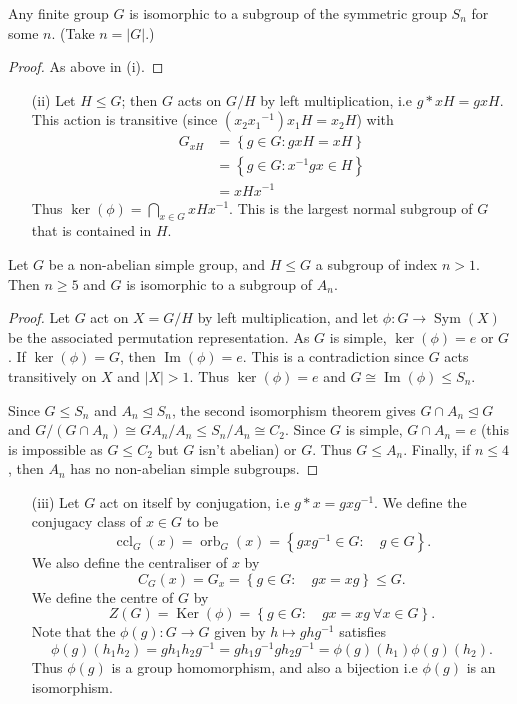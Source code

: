 \documentclass[egregdoesnotlikesansseriftitles,a4paper]{scrartcl}
\begin{document}
 \begin{theorem}
     Any finite group $G$ is isomorphic to a subgroup of the symmetric group $S_{n}$ for some $n$. (Take $n=|G|$.)
     \begin{proof}
      As above in (i).
      \end{proof}
 \end{theorem}
 \begin{itemize}
      \item[(ii)] Let $H \leq G$; then $G$ acts on $G/H$ by left multiplication, i.e $g \ast x H= gxH$. This action is transitive (since $(x_2 {x_1 }^{-1})x_1 H=x_2 H$) with 
      \begin{align*}
          G_{xH}&=\left\{g \in G: gxH=xH\right\}\\&=\left\{g \in G: {x}^{-1}gx \in H\right\}\\&=xH {x}^{-1} 
      \end{align*} Thus $\operatorname{ker}(\phi)=\bigcap_{x \in G}xH {x}^{-1}$. This is the largest normal subgroup of $G$ that is contained in $H$.  
 \end{itemize}
 \begin{theorem}
       Let $G$ be a non-abelian simple group, and $H \leq G$ a subgroup of index $n>1$. Then $n \geq 5$ and $G$ is isomorphic to a subgroup of $A_{n}$.
       \begin{proof}
            Let $G$ act on $X=G/H$ by left multiplication, and let $\phi: G \rightarrow \operatorname{Sym}(X)$ be the associated permutation representation. As $G$ is simple, $\operatorname{ker}(\phi)=e$ or $G$. If $\operatorname{ker}(\phi)=G$, then $\operatorname{Im}(\phi)=e$. This is a contradiction since $G$ acts transitively on $X$ and $|X|>1$. Thus $\operatorname{ker}(\phi)=e$ and $G \cong \operatorname{Im}(\phi) \leq S_{n}.$ 
            
            Since $G \leq S_{n}$ and $A_n \unlhd S_n$, the second isomorphism theorem gives $G \cap A_n \unlhd G$ and $G/(G \cap A_n) \cong GA_n/A_n \leq S_n / A_n \cong C_2 $. Since $G$ is simple, $G \cap A_n=e$ (this is impossible as $G \leq C_2 $ but $G$ isn't abelian) or $G$. Thus $G \leq A_{n} $. Finally, if $n \leq 4$, then $A_n$ has no non-abelian simple subgroups.
        \end{proof}
 \end{theorem}
\begin{itemize}
     \item[(iii)] Let $G$ act on itself by conjugation, i.e $g \ast x= gx {g}^{-1}$. We define the conjugacy class of $x \in G$ to be \[
     \operatorname{ccl}_G (x)=\operatorname{orb}_{G}(x)=\left\{gx {g}^{-1} \in G: \quad g \in G\right\}
     .\] We also define the centraliser of $x$ by \[
     C_{G}(x)=G_{x}= \left\{g \in G: \quad gx=xg\right\} \leq G
     .\] We define the centre of $G$ by \[
     Z (G)=\operatorname{Ker}(\phi)=\left\{g \in G: \quad gx=xg \ \forall x \in G\right\}
     .\] Note that the $\phi (g): G \rightarrow G$ given by $h \mapsto gh {g}^{-1}$ satisfies \[
     \phi (g)(h_1 h_2 )=gh_1 h_2 {g}^{-1}=gh_1 {g}^{-1} gh_2 {g}^{-1} =\phi (g)(h_1 )\phi (g)(h_2 )
     .\]  Thus $\phi (g)$ is a group homomorphism, and also a bijection i.e $\phi (g)$ is an isomorphism. 
\end{itemize}
\end{document}

